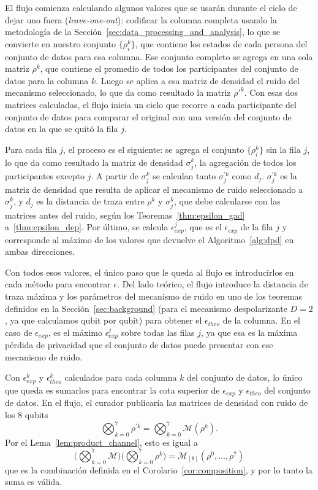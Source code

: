 \documentclass{ieeeaccess}
\begin{document}
El flujo comienza calculando algunos valores que se usarán durante el ciclo de dejar uno fuera (\textit{leave-one-out}): codificar la columna completa usando la metodología de la Sección~\ref{sec:data_processing_and_analysis}, lo que se convierte en nuestro conjunto $\{\rho_i^{k}\}$, que contiene los estados de cada persona del conjunto de datos para esa columna. Ese conjunto completo se agrega en una sola matriz $\rho^{k}$, que contiene el promedio de todos los participantes del conjunto de datos para la columna $k$. Luego se aplica a esa matriz de densidad el ruido del mecanismo seleccionado, lo que da como resultado la matriz $\rho'^{k}$. Con esas dos matrices calculadas, el flujo inicia un ciclo que recorre a cada participante del conjunto de datos para comparar el original con una versión del conjunto de datos en la que se quitó la fila $j$.

Para cada fila $j$, el proceso es el siguiente: se agrega el conjunto $\{\rho_i^{k}\}$ sin la fila $j$, lo que da como resultado la matriz de densidad $\sigma_j^{k}$, la agregación de todos los participantes excepto $j$. A partir de $\sigma_j^{k}$ se calculan tanto $\sigma_j^{\prime k}$ como $d_j$. $\sigma_j^{\prime k}$ es la matriz de densidad que resulta de aplicar el mecanismo de ruido seleccionado a $\sigma_j^{k}$, y $d_j$ es la distancia de traza entre $\rho^{k}$ y $\sigma_{j}^{k}$, que debe calcularse con las matrices antes del ruido, según los Teoremas~\ref{thm:epsilon_gad} a~\ref{thm:epsilon_dep}. Por último, se calcula $\epsilon_{exp}^{j}$, que es el $\epsilon_{exp}$ de la fila $j$ y corresponde al máximo de los valores que devuelve el Algoritmo~\ref{alg:dpd} en ambas direcciones.

Con todos esos valores, el único paso que le queda al flujo es introducirlos en cada método para encontrar $\epsilon$. Del lado teórico, el flujo introduce la distancia de traza máxima y los parámetros del mecanismo de ruido en uno de los teoremas definidos en la Sección~\ref{sec:background} (para el mecanismo despolarizante $D=2$, ya que calculamos qubit por qubit) para obtener el $\epsilon_{theo}$ de la columna. En el caso de $\epsilon_{exp}$, es el máximo $\epsilon_{exp}^{j}$ sobre todas las filas $j$, ya que esa es la máxima pérdida de privacidad que el conjunto de datos puede presentar con ese mecanismo de ruido.

Con $\epsilon_{exp}^{k}$ y $\epsilon_{theo}^{k}$ calculados para cada columna $k$ del conjunto de datos, lo único que queda es sumarlos para encontrar la cota superior de $\epsilon_{exp}$ y $\epsilon_{theo}$ del conjunto de datos. En el flujo, el curador publicaría las matrices de densidad con ruido de los 8 qubits
\[
  \bigotimes_{k=0}^{7} \rho^{\prime k} = \bigotimes_{k=0}^{7} \mathcal{M}(\rho^{k}).
\]
Por el Lema~\ref{lem:product_channel}, esto es igual a
\[
  \Big(\bigotimes_{k=0}^{7} \mathcal{M}\Big)\Big(\bigotimes_{k=0}^{7} \rho^{k}\Big) = \mathcal{M}_{[8]}(\rho^{0}, \dots, \rho^{7})
\]
que es la combinación definida en el Corolario~\ref{cor:composition}, y por lo tanto la suma es válida.
\end{document}
